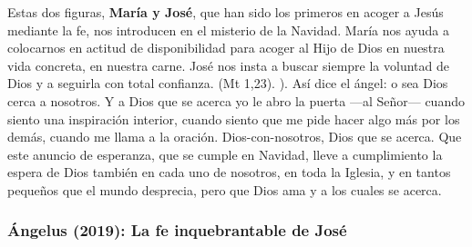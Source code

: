 \begin{body}
					Estas dos figuras, \textbf{María y José}, que han sido los primeros en acoger a Jesús mediante la fe, nos introducen en el misterio de la Navidad. María nos ayuda a colocarnos en actitud de disponibilidad para acoger al Hijo de Dios en nuestra vida concreta, en nuestra carne. José nos insta a buscar siempre la voluntad de Dios y a seguirla con total confianza.  (Mt 1,23). ). Así dice el ángel:  o sea Dios cerca a nosotros. Y a Dios que se acerca yo le abro la puerta ---al Señor--- cuando siento una inspiración interior, cuando siento que me pide hacer algo más por los demás, cuando me llama a la oración. Dios-con-nosotros, Dios que se acerca. Que este anuncio de esperanza, que se cumple en Navidad, lleve a cumplimiento la espera de Dios también en cada uno de nosotros, en toda la Iglesia, y en tantos pequeños que el mundo desprecia, pero que Dios ama y a los cuales se acerca.
				\end{body}

			\subsubsection{Ángelus (2019): La fe inquebrantable de José}
			
				
